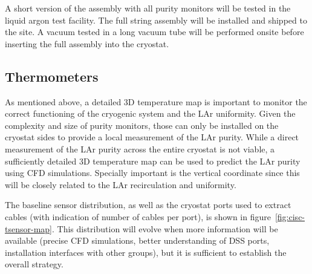 


A short version of the assembly with all purity monitors will be tested in the liquid argon test facility. The full string assembly will be installed and shipped to the  site. A vacuum tested in a long vacuum tube will be performed onsite before inserting the full assembly into the  cryostat. 




\subsection{Thermometers}
\label{sec:fdsp-cryo-therm}
As mentioned above, a detailed 3D temperature map is important to monitor the correct functioning of the cryogenic system and the LAr uniformity.
Given the complexity and size of purity monitors, those can only be installed on the cryostat sides to provide a local measurement of
the LAr purity. While a direct measurement of the LAr purity across the entire cryostat is not viable, a sufficiently detailed 3D temperature map
can be used to predict the LAr purity using CFD simulations. Specially important is the vertical coordinate since this will be closely related to
the LAr recirculation and uniformity. 

The baseline sensor distribution, as well as the cryostat ports used to extract cables (with indication of number of cables per port), is shown in figure~\ref{fig:cisc-tsensor-map}. This distribution will evolve when more information will be available (precise CFD simulations, better understanding of DSS ports, installation interfaces with other groups), but it is sufficient to establish the overall strategy.

